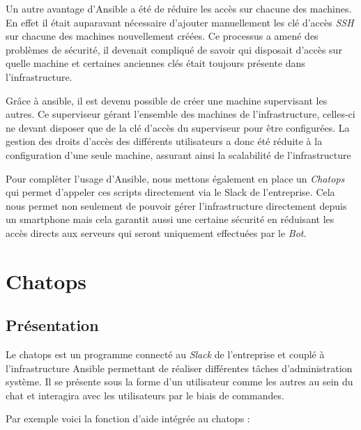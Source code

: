 \bigskip

Un autre avantage d'Ansible a été de réduire les accès sur chacune des
machines. En effet il était auparavant nécessaire d'ajouter manuellement
les clé d'accès \emph{SSH} sur chacune des machines nouvellement créées.
Ce processus a amené des problèmes de sécurité, il devenait compliqué de
savoir qui disposait d'accès sur quelle machine et certaines anciennes
clés était toujours présente dans l'infrastructure.

\bigskip

Grâce à ansible, il est devenu possible de créer une machine supervisant
les autres. Ce superviseur gérant l'ensemble des machines de
l'infrastructure, celles-ci ne devant disposer que de la clé d'accès du
superviseur pour être configurées. La gestion des droits d'accès des
différents utilisateurs a donc été réduite à la configuration d'une
seule machine, assurant ainsi la scalabilité de l'infrastructure

\bigskip

Pour complèter l'usage d'Ansible, nous mettons également en place un
\emph{Chatops} qui permet d'appeler ces scripts directement via le Slack
de l'entreprise. Cela nous permet non seulement de pouvoir gérer
l'infrastructure directement depuis un smartphone mais cela garantit
aussi une certaine sécurité en réduisant les accès directs aux serveurs
qui seront uniquement effectuées par le \emph{Bot}.

\newpage

\section{Chatops}\label{chatops}

\bigskip

\subsection{Présentation}\label{pruxe9sentation-1}

\bigskip

Le chatops est un programme connecté au \emph{Slack} de l'entreprise et
couplé à l'infrastructure Ansible permettant de réaliser différentes
tâches d'administration système. Il se présente sous la forme d'un
utilisateur comme les autres au sein du chat et interagira avec les
utilisateurs par le biais de commandes.

\bigskip

Par exemple voici la fonction d'aide intégrée au chatops :

